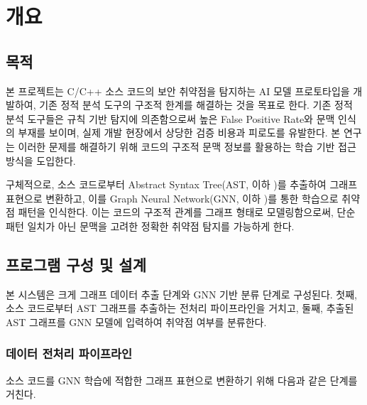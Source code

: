 \clearpage

\section{개요}

\subsection{목적}

본 프로젝트는 C/C++ 소스 코드의 보안 취약점을 탐지하는 AI 모델 프로토타입을 개발하여, 기존 정적 분석 도구의 구조적 한계를 해결하는 것을 목표로 한다.
기존 정적 분석 도구들은 규칙 기반 탐지에 의존함으로써 높은 False Positive Rate와 문맥 인식의 부재를 보이며, 실제 개발 현장에서 상당한 검증 비용과 피로도를 유발한다.
본 연구는 이러한 문제를 해결하기 위해 코드의 구조적 문맥 정보를 활용하는 학습 기반 접근 방식을 도입한다.

구체적으로, 소스 코드로부터 Abstract Syntax Tree(AST, 이하 \abbrAST)를 추출하여 그래프 표현으로 변환하고,
이를 Graph Neural Network(GNN, 이하 \abbrGNN)를 통한 학습으로 취약점 패턴을 인식한다.
이는 코드의 구조적 관계를 그래프 형태로 모델링함으로써, 단순 패턴 일치가 아닌 문맥을 고려한 정확한 취약점 탐지를 가능하게 한다.

\subsection{프로그램 구성 및 설계}

본 시스템은 크게 그래프 데이터 추출 단계와 GNN 기반 분류 단계로 구성된다.
첫째, 소스 코드로부터 AST 그래프를 추출하는 전처리 파이프라인을 거치고, 둘째, 추출된 AST 그래프를 GNN 모델에 입력하여 취약점 여부를 분류한다.

\subsubsection{데이터 전처리 파이프라인}

소스 코드를 GNN 학습에 적합한 그래프 표현으로 변환하기 위해 다음과 같은 단계를 거친다.


